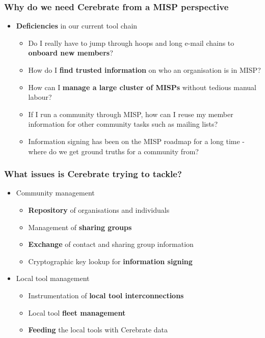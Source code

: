 \begin{frame}
    \frametitle{Why do we need Cerebrate from a MISP perspective}
    \begin{itemize}
        \item {\bf Deficiencies} in our current tool chain
        \begin{itemize}
            \item Do I really have to jump through hoops and long e-mail chains to {\bf onboard new members}?
            \item How do I {\bf find trusted information} on who an organisation is in MISP?
            \item How can I {\bf manage a large cluster of MISPs} without tedious manual labour?
            \item If I run a community through MISP, how can I reuse my member information for other community tasks such as mailing lists?
            \item Information signing has been on the MISP roadmap for a long time - where do we get ground truths for a community from?
        \end{itemize}
    \end{itemize}
\end{frame}

\begin{frame}
    \frametitle{What issues is Cerebrate trying to tackle?}
    \begin{itemize}
        \item Community management
        \begin{itemize}
            \item {\bf Repository} of organisations and individuals
            \item Management of {\bf sharing groups}
            \item {\bf Exchange} of contact and sharing group information
            \item Cryptographic key lookup for {\bf information signing}
        \end{itemize}
        \item Local tool management
        \begin{itemize}
            \item Instrumentation of {\bf local tool interconnections}
            \item Local tool {\bf fleet management}
            \item {\bf Feeding} the local tools with Cerebrate data
        \end{itemize}
    \end{itemize}
\end{frame}

